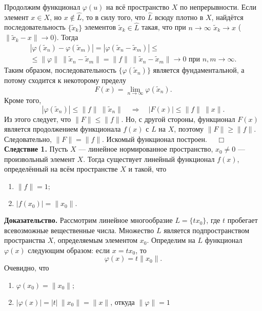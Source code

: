 \documentclass[12pt,a4paper, titlepage]{article}
\begin{document}
Продолжим функционал $\varphi(u)$ на всё пространство $X$ по непрерывности. Если элемент $x \in X$, но $x \notin \widehat L$, то в силу того, что $\widehat L$ всюду плотно в $X$, найдётся последовательность $\lbrace \tilde{x}{}_k \rbrace$ элементов $\tilde{x}{}_k \in \widehat L$ такая, что при $n\to\infty$ $\tilde{x}{}_k \to x$ ($\|\tilde{x}{}_k - x\| \to 0$). Тогда
\begin{multline*}
|\varphi (\tilde{x}{}_n) - \varphi (\tilde{x}{}_m)| = |\varphi (\tilde{x}{}_n - \tilde{x}{}_m)| \leqslant \\
\leqslant \|\varphi\| \ \|\tilde{x}{}_n - \tilde{x}{}_m\| = \|f\| \ \|\tilde x_n - \tilde x_m\| \to 0 \text{ при } n,m \to \infty.
\end{multline*}
Таким образом, последовательность $\lbrace \varphi (\tilde{x}{}_n) \rbrace$ является фундаментальной, а потому сходится к некоторому пределу
$$
F(x) = \lim_{n\to \infty} \varphi (\tilde{x}{}_n).
$$
Кроме того,
$$
|\varphi (\tilde{x}{}_n)| \leqslant \|f\| \ \|\tilde x_n\| \quad \Rightarrow \quad |F(x)| \leqslant \|f\| \ \|x\|.
$$
Из этого следует, что $\|F\| \leqslant \|f\|$. Но, с другой стороны, функционал $F(x)$ является продолжением функционала $f(x)$ с $L$ на $X$, поэтому $\|F\| \geqslant \|f\|$. Следовательно, $\|F\| = \|f\|$. Искомый функционал построен. $\quad \Box$\\

\textbf{Следствие 1.} Пусть $X$ --- линейное нормированное пространство, $x_0 \neq 0$ --- произвольный элемент $X$. Тогда существует линейный функционал $f(x)$, определённый на всём пространстве $X$ и такой, что
\begin{enumerate}
\item
$\|f\| = 1;$
\item
$|f(x_0)| = \|x_0\|.$
\end{enumerate}

\textbf{Доказательство.} Рассмотрим линейное многообразие $L = \lbrace t x_0 \rbrace$, где $t$ пробегает всевозможные вещественные числа. Множество $L$ является подпространством пространства $X$, определяемым элементом $x_0$. Определим на $L$ функционал $\varphi(x)$ следующим образом: если $x = tx_0$, то
$$
\varphi (x) = t \|x_0\|.
$$
Очевидно, что
\begin{enumerate}
\item
$\varphi (x_0) = \|x_0\|;$

\item
$|\varphi (x)| = |t| \ \|x_0\| = \|x\|$, откуда $\|\varphi \| = 1$
\end{enumerate}
\end{document}
